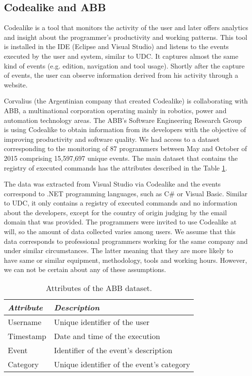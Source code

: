 \subsection{Codealike and ABB}
Codealike \cite{CLQ15} is a tool that monitors the activity of the user and later offers analytics and insight about the programmer's productivity and working patterns. This tool is installed in the IDE (Eclipse and Visual Studio) and listens to the events executed by the user and system, similar to UDC. It captures almost the same kind of events (e.g. edition, navigation and tool usage). Shortly after the capture of events, the user can observe information derived from his activity through a website.

Corvalius (the Argentinian company that created Codealike) is collaborating with ABB, a multinational corporation operating mainly in robotics, power and automation technology areas. The ABB's Software Engineering Research Group is using Codealike to obtain information from its developers with the objective of improving productivity and software quality. We had access to a dataset corresponding to the monitoring of 87 programmers between May and October of 2015 comprising 15,597,697 unique events. The main dataset that contains the registry of executed commands has the attributes described in the Table \ref{tbl:att_abb}.

The data was extracted from Visual Studio via Codealike and the events correspond to .NET programming languages, such as C\# or Visual Basic. Similar to UDC, it only contains a registry of executed commands and no information about the developers, except for the country of origin judging by the email domain that was provided. The programmers were invited to use Codealike at will, so the amount of data collected varies among users. We assume that this data corresponds to professional programmers working for the same company and under similar circumstances. The latter meaning that they are more likely to have same or similar equipment, methodology, tools and working hours. However, we can not be certain about any of these assumptions.

\begin{table}[ht!]
	\small
	\caption{Attributes of the ABB dataset. }
	\label{tbl:att_abb}
	\centering
	\begin{tabular}{p{2.5cm}|p{7cm}} 
		\hline 
		\emph{Attribute} & \emph{Description} \\  
		\hline 
		\hline 
		Username &  Unique identifier of the user \\
		\hline
		Timestamp & Date and time of the execution  \\
		\hline
		Event & Identifier of the event's description  \\
		\hline
		Category & Unique identifier of the event's category \\
		\hline
	\end{tabular}
	
\end{table}

